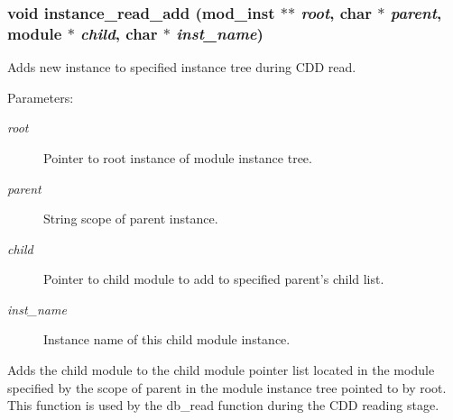 \subsubsection{\setlength{\rightskip}{0pt plus 5cm}void instance\_\-read\_\-add ({\bf mod\_\-inst} $\ast$$\ast$ {\em root}, char $\ast$ {\em parent}, {\bf module} $\ast$ {\em child}, char $\ast$ {\em inst\_\-name})}\label{instance_8h_a4}


Adds new instance to specified instance tree during CDD read. 

\begin{Desc}
\item[Parameters:]
\begin{description}
\item[{\em root}]Pointer to root instance of module instance tree. \item[{\em parent}]String scope of parent instance. \item[{\em child}]Pointer to child module to add to specified parent's child list. \item[{\em inst\_\-name}]Instance name of this child module instance.\end{description}
\end{Desc}
Adds the child module to the child module pointer list located in the module specified by the scope of parent in the module instance tree pointed to by root. This function is used by the db\_\-read function during the CDD reading stage. 